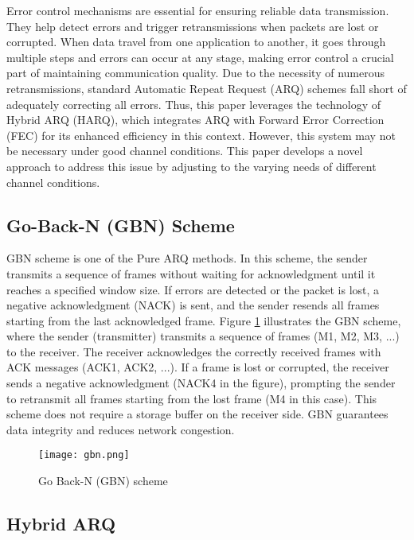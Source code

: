 \documentclass[sn-mathphys-num]{sn-jnl}
\theoremstyle{thmstyleone}
\theoremstyle{thmstyletwo}%
\theoremstyle{thmstylethree}%
\begin{document}
Error control mechanisms are essential for ensuring reliable data transmission. They help detect errors and trigger retransmissions when packets are lost or corrupted. When data travel from one application to another, it goes through multiple steps and errors can occur at any stage, making error control a crucial part of maintaining communication quality\cite{r5}. Due to the necessity of numerous retransmissions, standard Automatic Repeat Request (ARQ) schemes fall short of adequately correcting all errors.  Thus, this paper leverages the technology of Hybrid ARQ (HARQ), which integrates ARQ with Forward Error Correction (FEC) \cite{r14, r13} for its enhanced efficiency in this context. However, this system may not be necessary under good channel conditions. This paper develops a novel approach to address this issue by adjusting to the varying needs of different channel conditions.

\subsection{Go-Back-N (GBN) Scheme } \label{s1.1}

GBN scheme \cite{r26} is one of the Pure ARQ methods. In this scheme, the sender transmits a sequence of frames without waiting for acknowledgment until it reaches a specified window size. If errors are detected or the packet is lost, a negative acknowledgment (NACK) \cite{r12}  is sent, and the sender resends all frames starting from the last acknowledged frame. Figure \ref{fig:1}  \cite{r12} illustrates the GBN scheme, where the sender (transmitter) transmits a sequence of frames (M1, M2, M3, ...) to the receiver. The receiver acknowledges the correctly received frames with ACK messages (ACK1, ACK2, ...). If a frame is lost or corrupted, the receiver sends a negative acknowledgment (NACK4 in the figure), prompting the sender to retransmit all frames starting from the lost frame (M4 in this case). This scheme does not require a storage buffer on the receiver side. GBN guarantees data integrity and reduces network congestion.

\begin{figure}[H]
    \centering
    \texttt{[image: gbn.png]}
    \caption{Go Back-N (GBN) scheme}
    \label{fig:1}
\end{figure}

\subsection{Hybrid ARQ} \label{s1.2}
\end{document}
